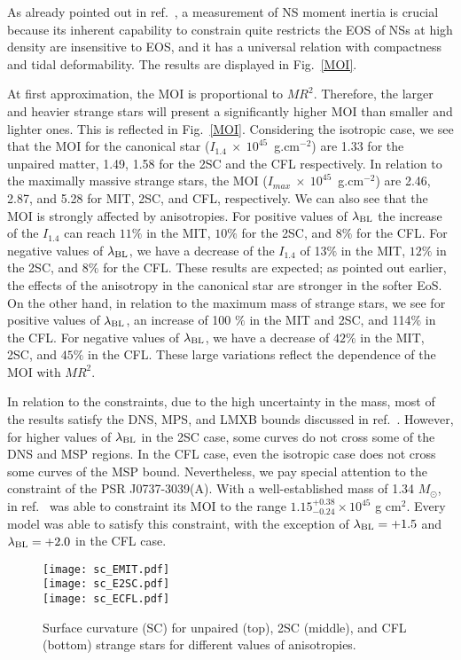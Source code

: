 \documentclass[%
reprint,
superscriptaddress,
nofootinbib,
amsmath,
amssymb,
aps,
floatfix,
showkeys,
]{revtex4-2}
\begin{document}
As already pointed out in ref.~\cite{Sulaksono_2020}, a measurement of NS moment inertia is crucial because its inherent capability to constrain quite restricts the EOS of NSs at high density are insensitive to EOS, and it has a universal relation with compactness and tidal deformability. The results are displayed in Fig.~\ref{MOI}.

At first approximation, the MOI is proportional to $MR^2$. Therefore, the larger and heavier strange stars will present a significantly higher MOI than smaller and lighter ones. This is reflected in Fig.~\ref{MOI}. Considering the isotropic case, we see that the MOI for the canonical star ($I_{1.4}~\times~10^{45}$~g.cm$^{-2}$) are  1.33 for the unpaired matter, 1.49, 1.58 for the 2SC and the CFL respectively. In relation to the maximally massive strange stars, the MOI ($I_{max}~\times~10^{45}$~g.cm$^{-2}$) are 2.46, 2.87, and 5.28 for MIT, 2SC, and CFL, respectively.
We can also see that the MOI is strongly affected by anisotropies. For positive values of $\lambda_{\rm BL}$ the increase of the $I_{1.4}$ can reach $11\%$ in the MIT, $10\%$ for the 2SC, and 8$\%$ for the CFL. For negative values of $\lambda_{\rm BL}$, we have a decrease of the $I_{1.4}$ of 13$\%$ in the MIT, $12\%$ in the 2SC, and $8\%$ for the CFL. These results are expected; as pointed out earlier, the effects of the anisotropy in the canonical star are stronger in the softer EoS. On the other hand, in relation to the maximum mass of strange stars, we see for positive values of $\lambda_{\rm BL}$, an increase of 100 $\%$ in the MIT and 2SC, and 114$\%$ in the CFL. 
For negative values of $\lambda_{\rm BL}$, we have a decrease of $42\%$ in the MIT, 2SC, and $45\%$ in the CFL. These large variations reflect the dependence of the MOI with $MR^2$.

In relation to the constraints, due to the high uncertainty in the mass, most of the results satisfy the DNS, MPS, and LMXB bounds discussed in ref.~\cite{Landry_2018, Kumar_2019}. However, for higher values of $\lambda_{\rm BL}$ in the 2SC case, some curves do not cross some of the DNS and MSP regions. In the CFL case, even the isotropic case does not cross some curves of the MSP bound. Nevertheless, we pay special attention to the constraint of the PSR J0737-3039(A). With a well-established mass of 1.34 $M_\odot$, in ref.~\cite{Landry_2018} was able to constraint its MOI to the range $1.15_{-0.24}^{+0.38}\times 10^{45}$ g cm$^2$. Every model was able to satisfy this constraint, with the exception of $\lambda_{\rm BL} = +1.5$ and $\lambda_{\rm BL} = +2.0$ in the CFL case.
\begin{figure}
    \centering
    \texttt{[image: sc\_EMIT.pdf]} \\
     \texttt{[image: sc\_E2SC.pdf]} \\
       \texttt{[image: sc\_ECFL.pdf]}
    \caption{ Surface curvature (SC) for unpaired (top), 2SC (middle), and  CFL (bottom) strange stars for different values of anisotropies.}
    \label{SC}
\end{figure}
\end{document}
